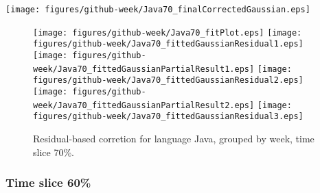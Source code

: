 \begin{center}
{\texttt{[image: figures/github-week/Java70\_finalCorrectedGaussian.eps]}}
\end{center}

\FloatBarrier

\begin{figure}[t]
\centering
{}
{\texttt{[image: figures/github-week/Java70\_fitPlot.eps]}}
{\texttt{[image: figures/github-week/Java70\_fittedGaussianResidual1.eps]}}
{\texttt{[image: figures/github-week/Java70\_fittedGaussianPartialResult1.eps]}}
{\texttt{[image: figures/github-week/Java70\_fittedGaussianResidual2.eps]}}
{\texttt{[image: figures/github-week/Java70\_fittedGaussianPartialResult2.eps]}}
{\texttt{[image: figures/github-week/Java70\_fittedGaussianResidual3.eps]}}
\caption{Residual-based corretion for language Java, grouped by week, time slice 70\%.}
\end{figure}


\FloatBarrier


\subsubsection{Time slice 60\%}

